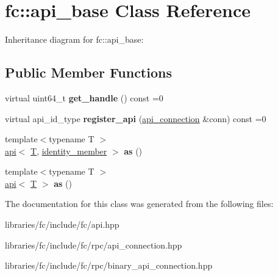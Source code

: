 \hypertarget{classfc_1_1api__base}{}\section{fc\+:\+:api\+\_\+base Class Reference}
\label{classfc_1_1api__base}


Inheritance diagram for fc\+:\+:api\+\_\+base\+:
\subsection*{Public Member Functions}
\begin{DoxyCompactItemize}
\item 
\mbox{\label{classfc_1_1api__base_a101030d0c1e946040fc8dade7f051309}} 
virtual uint64\+\_\+t {\bfseries get\+\_\+handle} () const =0
\item 
\mbox{\label{classfc_1_1api__base_a999476d6eb0dd3a40d40a496c9c1a318}} 
virtual api\+\_\+id\+\_\+type {\bfseries register\+\_\+api} (\mbox{\hyperlink{classfc_1_1api__connection}{api\+\_\+connection}} \&conn) const =0
\item 
\mbox{\label{classfc_1_1api__base_a43c07aebad22a77e3813a875f8874862}} 
{\footnotesize template$<$typename T $>$ }\\\mbox{\hyperlink{classfc_1_1api}{api}}$<$ \mbox{\hyperlink{struct_t}{T}}, \mbox{\hyperlink{structfc_1_1identity__member}{identity\+\_\+member}} $>$ {\bfseries as} ()
\item 
\mbox{\label{classfc_1_1api__base_acd5bdfb71e2f032cf843b67b6043f063}} 
{\footnotesize template$<$typename T $>$ }\\\mbox{\hyperlink{classfc_1_1api}{api}}$<$ \mbox{\hyperlink{struct_t}{T}} $>$ {\bfseries as} ()
\end{DoxyCompactItemize}


The documentation for this class was generated from the following files\+:\begin{DoxyCompactItemize}
\item 
libraries/fc/include/fc/api.\+hpp\item 
libraries/fc/include/fc/rpc/api\+\_\+connection.\+hpp\item 
libraries/fc/include/fc/rpc/binary\+\_\+api\+\_\+connection.\+hpp\end{DoxyCompactItemize}
